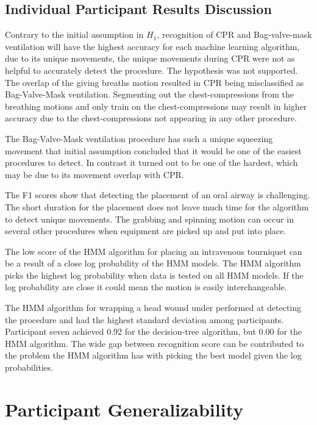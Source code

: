 \subsection{Individual Participant Results Discussion}
\label{sec:Results:Individual:Discussion}
Contrary to the initial assumption in $H_1$, recognition of CPR and Bag-valve-mask ventilation will have the highest accuracy for each machine learning algorithm, due to its unique movements, the unique movements during CPR were not as helpful to accurately detect the procedure. The hypothesis was not supported. The overlap of the giving breaths motion resulted in CPR being misclassified as Bag-Valve-Mask ventilation. Segmenting out the chest-compressions from the breathing motions and only train on the chest-compressions may result in higher accuracy due to the chest-compressions not appearing in any other procedure.
\par The Bag-Valve-Mask ventilation procedure has such a unique squeezing movement that initial assumption concluded that it would be one of the easiest procedures to detect. In contrast it turned out to be one of the hardest, which may be due to its movement overlap with CPR.
\par The F1 scores show that detecting the placement of an oral airway is challenging. The short duration for the placement does not leave much time for the algorithm to detect unique movements. The grabbing and spinning motion can occur in several other procedures when equipment are picked up and put into place.
\par The low score of the HMM algorithm for placing an intravenous tourniquet can be a result of a close log probability of the HMM models. The HMM algorithm picks the highest log probability when data is tested on all HMM models. If the log probability are close it could mean the motion is easily interchangeable.
\par The HMM algorithm for wrapping a head wound under performed at detecting the procedure and had the highest standard deviation among participants. Participant seven achieved 0.92 for the decision-tree algorithm, but 0.00 for the HMM algorithm. The wide gap between recognition score can be contributed to the problem the HMM algorithm has with picking the best model given the log probabilities.

\section{Participant Generalizability}
\label{sec:Results:Generalizability}

